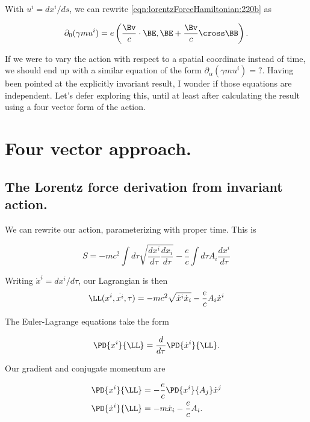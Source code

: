 With $u^i = dx^i/ds$, we can rewrite \ref{eqn:lorentzForceHamiltonian:220b} as

\begin{equation}\label{eqn:lorentzForceHamiltonian:230}
\partial_0 (\gamma m u^i) 
= e \left( \frac{\Bv}{c} \cdot \BE, \BE + \frac{\Bv}{c} \cross \BB \right).
\end{equation}

If we were to vary the action with respect to a spatial coordinate instead of time, we should end up with a similar equation of the form $\partial_\alpha (\gamma m u^i) = ?$.  Having been pointed at the explicitly invariant result, I wonder if those equations are independent.  Let's defer exploring this, until at least after calculating the result using a four vector form of the action.

\section{Four vector approach.}
\subsection{The Lorentz force derivation from invariant action.}

We can rewrite our action, parameterizing with proper time.  This is

\begin{equation}\label{eqn:lorentzForceHamiltonian:240}
S = -m c^2 \int d\tau \sqrt{ \frac{dx^i}{d\tau} \frac{dx_i}{d\tau} }
- \frac{e}{c} \int d\tau A_i \frac{dx^i}{d\tau}
\end{equation}

Writing $\dot{x}^i = dx^i/d\tau$, our Lagrangian is then
\begin{equation}\label{eqn:lorentzForceHamiltonian:250}
\LL(x^i, \dot{x^i}, \tau)
= -m c^2 \sqrt{ \dot{x}^i \dot{x}_i }
- \frac{e}{c} A_i \dot{x}^i
\end{equation}

The Euler-Lagrange equations take the form

\begin{equation}\label{eqn:lorentzForceHamiltonian:255}
\PD{x^i}{\LL} 
= 
\frac{d}{d\tau} \PD{\dot{x}^i}{\LL} .
\end{equation}

Our gradient and conjugate momentum are

\begin{align}\label{eqn:lorentzForceHamiltonian:260}
\PD{x^i}{\LL} 
&= - \frac{e}{c} \PD{x^i}{A_j} \dot{x}^j  \\
\PD{\dot{x}^i}{\LL}  
&= -m \dot{x}_i - \frac{e}{c} A_i.
\end{align}

